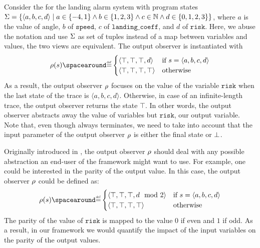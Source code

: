 \begin{example}
  Consider the  for the landing alarm system with program states $\Sigma=\{\langle a, b, c, d \rangle \mid a\in\{-4,1\}\land b\in\{1,2,3\}\land c\in\mathbb{N} \land d\in\{0,1,2,3\}\}$, where $a$ is the value of $\text{angle}$, $b$ of $\texttt{speed}$, $c$ of $\texttt{landing\_coeff}$, and $d$ of $\texttt{risk}$.
  Here, we abuse the notation and use $\Sigma$ as set of tuples instead of a map between variables and values, the two views are equivalent.
  The output observer is instantiated with
  \[
  \outputobs(\defstate) \DefeQ \begin{cases}
    \langle \top, \top, \top, d \rangle & \text{if } \defstate = \langle a, b, c, d \rangle \\
    \langle \top, \top, \top, \top \rangle & \text{otherwise}
  \end{cases}
  \]
  As a result, the output observer $\rho$ focuses on the value of the variable $\texttt{risk}$ when the last state of the trace is $\langle a, b, c, d \rangle$. Otherwise, in case of an infinite-length trace, the output observer returns the state $\top$.
  In other words, the output observer abstracts away the value of variables but $\texttt{risk}$, our output variable.
  Note that, even though  always terminates, we need to take into account that the input parameter of the output observer $\rho$ is either the final state or $\bot$.
\end{example}

\begin{example}
  Originally introduced in , the output observer $\rho$ should deal with any possible abstraction an end-user of the framework might want to use.
  For example, one could be interested in the parity of the output value.
  In this case, the output observer $\rho$ could be defined as:
  \[
  \outputobs(\defstate) \DefeQ \begin{cases}
    \langle \top, \top, \top, d \mod 2 \rangle & \text{if } \defstate = \langle a, b, c, d \rangle \\
    \langle \top, \top, \top, \top \rangle & \text{otherwise}
  \end{cases}
  \]
  The parity of the value of $\texttt{risk}$ is mapped to the value $0$ if even and $1$ if odd.
  As a result, in our framework we would quantify the impact of the input variables on the parity of the output values.
\end{example}

